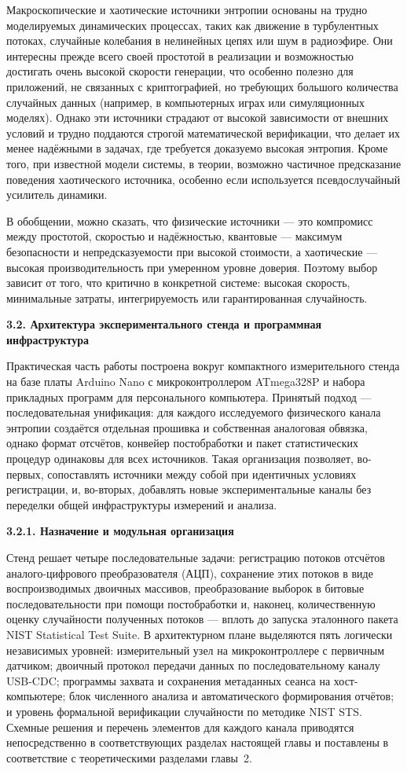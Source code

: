 Макроскопические и хаотические источники энтропии основаны на трудно
моделируемых динамических процессах, таких как движение в турбулентных
потоках, случайные колебания в нелинейных цепях или шум в радиоэфире.
Они интересны прежде всего своей простотой в реализации и возможностью
достигать очень высокой скорости генерации, что особенно полезно для
приложений, не связанных с криптографией, но требующих большого
количества случайных данных (например, в компьютерных играх или
симуляционных моделях). Однако эти источники страдают от высокой
зависимости от внешних условий и трудно поддаются строгой математической
верификации, что делает их менее надёжными в задачах, где требуется
доказуемо высокая энтропия. Кроме того, при известной модели системы, в
теории, возможно частичное предсказание поведения хаотического
источника, особенно если используется псевдослучайный усилитель
динамики.

В обобщении, можно сказать, что физические источники --- это компромисс
между простотой, скоростью и надёжностью, квантовые --- максимум
безопасности и непредсказуемости при высокой стоимости, а хаотические ---
высокая производительность при умеренном уровне доверия. Поэтому выбор
зависит от того, что критично в конкретной системе: высокая скорость,
минимальные затраты, интегрируемость или гарантированная случайность.

\textbf{3.2. Архитектура экспериментального стенда и программная инфраструктура}

Практическая часть работы построена вокруг компактного измерительного стенда на базе
платы Arduino Nano с микроконтроллером ATmega328P и набора прикладных программ для
персонального компьютера. Принятый подход --- последовательная унификация: для каждого
исследуемого физического канала энтропии создаётся отдельная прошивка и собственная
аналоговая обвязка, однако формат отсчётов, конвейер постобработки и пакет статистических
процедур одинаковы для всех источников. Такая организация позволяет, во-первых,
сопоставлять источники между собой при идентичных условиях регистрации, и, во-вторых,
добавлять новые экспериментальные каналы без переделки общей инфраструктуры
измерений и анализа.

\textbf{3.2.1. Назначение и модульная организация}

Стенд решает четыре последовательные задачи: регистрацию потоков отсчётов
аналого-цифрового преобразователя (АЦП), сохранение этих потоков в виде воспроизводимых
двоичных массивов, преобразование выборок в битовые последовательности при помощи
постобработки и, наконец, количественную оценку случайности полученных потоков ---
вплоть до запуска эталонного пакета NIST Statistical Test Suite. В архитектурном плане
выделяются пять логически независимых уровней: измерительный узел на микроконтроллере
с первичным датчиком; двоичный протокол передачи данных по последовательному
каналу USB-CDC; программы захвата и сохранения метаданных сеанса на хост-компьютере;
блок численного анализа и автоматического формирования отчётов; и уровень формальной
верификации случайности по методике NIST STS. Схемные решения и перечень элементов
для каждого канала приводятся непосредственно в соответствующих разделах настоящей
главы и поставлены в соответствие с теоретическими разделами главы~2.

